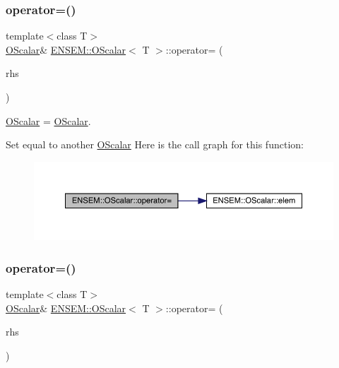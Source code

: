 \subsubsection{\texorpdfstring{operator=()}{operator=()}\hspace{0.1cm}{\footnotesize\ttfamily [8/12]}}
{\footnotesize\ttfamily template$<$class T$>$ \\
\mbox{\hyperlink{classENSEM_1_1OScalar}{O\+Scalar}}\& \mbox{\hyperlink{classENSEM_1_1OScalar}{E\+N\+S\+E\+M\+::\+O\+Scalar}}$<$ T $>$\+::operator= (\begin{DoxyParamCaption}\item[{const \mbox{\hyperlink{classENSEM_1_1OScalar}{O\+Scalar}}$<$ T $>$ \&}]{rhs }\end{DoxyParamCaption})\hspace{0.3cm}{\ttfamily [inline]}}



\mbox{\hyperlink{classENSEM_1_1OScalar}{O\+Scalar}} = \mbox{\hyperlink{classENSEM_1_1OScalar}{O\+Scalar}}. 

Set equal to another \mbox{\hyperlink{classENSEM_1_1OScalar}{O\+Scalar}} Here is the call graph for this function\+:
\nopagebreak
\begin{figure}[H]
\begin{center}
\leavevmode
\includegraphics[width=350pt]{da/d80/classENSEM_1_1OScalar_a7c36649387edf21f3fa19f9ae63d4aca_cgraph}
\end{center}
\end{figure}
\mbox{\label{classENSEM_1_1OScalar_a7c36649387edf21f3fa19f9ae63d4aca}} 
\subsubsection{\texorpdfstring{operator=()}{operator=()}\hspace{0.1cm}{\footnotesize\ttfamily [9/12]}}
{\footnotesize\ttfamily template$<$class T$>$ \\
\mbox{\hyperlink{classENSEM_1_1OScalar}{O\+Scalar}}\& \mbox{\hyperlink{classENSEM_1_1OScalar}{E\+N\+S\+E\+M\+::\+O\+Scalar}}$<$ T $>$\+::operator= (\begin{DoxyParamCaption}\item[{const \mbox{\hyperlink{classENSEM_1_1OScalar}{O\+Scalar}}$<$ T $>$ \&}]{rhs }\end{DoxyParamCaption})\hspace{0.3cm}{\ttfamily [inline]}}



